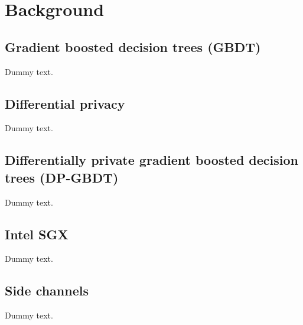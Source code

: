 \chapter{Background}

\section{Gradient boosted decision trees (GBDT)}

Dummy text.

\section{Differential privacy}

Dummy text.

\section{Differentially private gradient boosted decision trees (DP-GBDT)}

Dummy text.

\section{Intel SGX}

Dummy text.

\section{Side channels}

Dummy text.